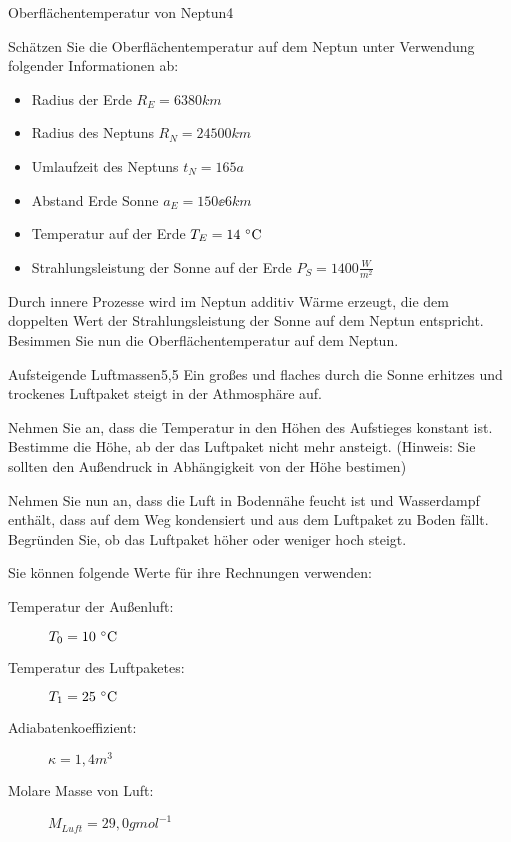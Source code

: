 \begin{problem}{Oberflächentemperatur von Neptun}{4}
  \begin{abcenum}
    \item Schätzen Sie die Oberflächentemperatur auf dem Neptun unter Verwendung folgender Informationen ab:
      \begin{itemize}
        \item Radius der Erde $R_E=6380\unit{km}$
        \item Radius des Neptuns $R_N=24500\unit{km}$
        \item Umlaufzeit des Neptuns $t_N=165\unit{a}$
        \item Abstand Erde Sonne $a_E=150\ee{6}\unit{km}$
        \item Temperatur auf der Erde $T_E=14\,\mathrm{\,\mathrm{^\circ C}}$
        \item Strahlungsleistung der Sonne auf der Erde $P_S=1400\unit{\frac{W}{m^2}}$
      \end{itemize}
    \item Durch innere Prozesse wird im Neptun additiv Wärme erzeugt, die dem doppelten Wert der Strahlungsleistung der Sonne auf dem Neptun entspricht. Besimmen Sie nun die Oberflächentemperatur auf dem Neptun.
  \end{abcenum}
\end{problem}

\begin{problem}{Aufsteigende Luftmassen}{5,5}
Ein großes und flaches durch die Sonne erhitzes und trockenes Luftpaket steigt in der Athmosphäre auf.
\begin{abcenum}
  \item Nehmen Sie an, dass die Temperatur in den Höhen des Aufstieges konstant ist. Bestimme die Höhe, ab der das Luftpaket nicht mehr ansteigt. (Hinweis: Sie sollten den Außendruck in Abhängigkeit von der Höhe bestimen)
  \item Nehmen Sie nun an, dass die Luft in Bodennähe feucht ist und Wasserdampf enthält, dass auf dem Weg kondensiert und aus dem Luftpaket zu Boden fällt. Begründen Sie, ob das Luftpaket höher oder weniger hoch steigt.
\end{abcenum}
Sie können folgende Werte für ihre Rechnungen verwenden:
\begin{description}
\item[Temperatur der Außenluft:] $T_0=10\,\mathrm{\,\mathrm{^\circ C}}$
\item[Temperatur des Luftpaketes:] $T_1=25\,\mathrm{\,\mathrm{^\circ C}}$
\item[Adiabatenkoeffizient:] $\kappa=1,4\unit{m^3}$
\item[Molare Masse von Luft:] $M_{Luft}=29,0\unit{g mol^{-1}}$
\end{description}
\end{problem}

